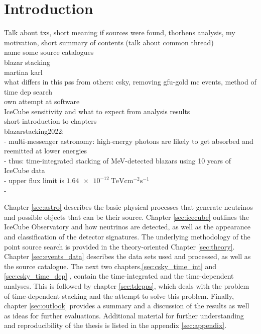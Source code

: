 \chapter{Introduction}
Talk about txs, short meaning if sources were found, thorbens analysis, my motivation, short summary of contents (talk about common thread)\\

name some source catalogues\\
blazar stacking\\
martina karl\\
what differs in this pss from others: csky, removing gfu-gold mc events, method of time dep search\\
own attempt at software\\
IceCube sensitivity and what to expect from analysis results\\
short introduction to chapters\\

blazarstacking2022:\\
- multi-messenger astronomy: high-energy photons are likely to get absorbed and reemitted at lower energies\\
- thus: time-integrated stacking of MeV-detected blazars using 10 years of IceCube data\\
- upper flux limit is $\SI{1.64e-12}{\tera\electronvolt\centi\meter\tothe{-2}\second\tothe{-1}}$\\
- \cite{blazar_stacking_2020}

Chapter \ref{sec:astro} describes the basic physical processes that generate neutrinos and possible objects that can be their source.
Chapter \ref{sec:icecube} outlines the IceCube Observatory and how neutrinos are detected, as well as the appearance and classification of the detector signatures.
The underlying methodology of the point source search is provided in the theory-oriented Chapter \ref{sec:theory}.
Chapter \ref{sec:events_data} describes the data sets used and processed, as well as the source catalogue.
The next two chapters,\ref{sec:csky_time_int} and \ref{sec:csky_time_dep} , contain the time-integrated and the time-dependent analyses.
This is followed by chapter \ref{sec:tdepps}, which deals with the problem of time-dependent stacking and the attempt to solve this problem.
Finally, chapter \ref{sec:outlook} provides a summary and a discussion of the results as well as ideas for further evaluations.
Additional material for further understanding and reproducibility of the thesis is listed in the appendix \ref{sec:appendix}.
